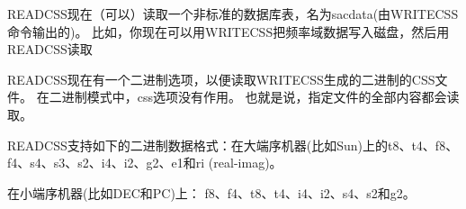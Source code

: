 READCSS现在（可以）读取一个非标准的数据库表，名为sacdata(由WRITECSS命令输出的)。%
比如，你现在可以用WRITECSS把频率域数据写入磁盘，然后用READCSS读取

READCSS现在有一个二进制选项，以便读取WRITECSS生成的二进制的CSS文件。
在二进制模式中，css选项没有作用。
也就是说，指定文件的全部内容都会读取。

READCSS支持如下的二进制数据格式：在大端序机器(比如Sun)上的t8、t4、f8、f4、s4、s3、s2、i4、i2、g2、e1和ri (real-imag)。

在小端序机器(比如DEC和PC)上： f8、f4、t8、t4、i4、i2、s4、s2和g2。

